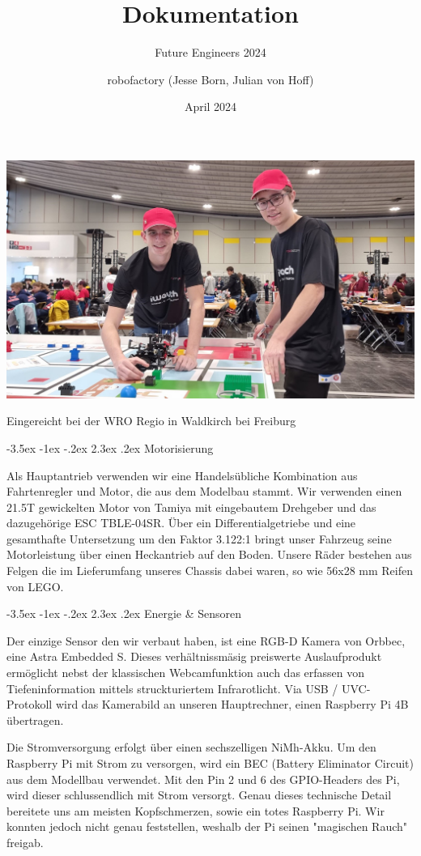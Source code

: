 \documentclass[a4paper]{scrarticle}
\makeatletter
\renewcommand\section{\@startsection {section}{1}{\z@}%
                                   {-3.5ex \@plus -1ex \@minus -.2ex}%
                                   {2.3ex \@plus.2ex}%
                                   {\Huge\AKAfont}}
\renewcommand{\maketitle}{%
																		 \begin{titlepage}
																			 \null\vfill %
																			 \begin{center}
																				{\huge\@title\par}%
																				\vspace{0.5cm} %
																				{\large\@subtitle\par} %
																				\vspace{1.5cm} %
																				{\Large\@author\par}
																				\vspace{2.5cm} %
																				\begin{center}
																					\includegraphics[width=15cm]{team}
																				\end{center}
																				\vfill
																				\vspace{0.5cm} %
																				{\large\@date\par} %
																				Eingereicht bei der WRO Regio in Waldkirch bei Freiburg
																			 \end{center}
																			 \@thanks %
																		 \end{titlepage}%
																	 }
\makeatother
\begin{document}
\title{\AKAfont\Huge\textcolor{AKSAcolor}{Dokumentation}}
\subtitle{Future Engineers 2024}
\author{robofactory (Jesse Born, Julian von Hoff)}
\date{April 2024}


\maketitle
\clearpage
\newpage



\section{Motorisierung}

Als Hauptantrieb verwenden wir eine Handelsübliche Kombination aus Fahrtenregler und Motor, die aus dem Modelbau stammt.
Wir verwenden einen 21.5T gewickelten Motor von Tamiya mit eingebautem Drehgeber und das dazugehörige ESC TBLE-04SR. 
Über ein Differentialgetriebe und eine gesamthafte Untersetzung um den Faktor 3.122:1 bringt unser Fahrzeug seine Motorleistung über einen Heckantrieb auf den Boden.
Unsere Räder bestehen aus Felgen die im Lieferumfang unseres Chassis dabei waren, so wie 56x28 mm Reifen von LEGO.

\section{Energie \& Sensoren}

Der einzige Sensor den wir verbaut haben, ist eine RGB-D Kamera von Orbbec, eine Astra Embedded S.
Dieses verhältnissmäsig preiswerte Auslaufprodukt ermöglicht nebst der klassischen Webcamfunktion auch das erfassen von Tiefeninformation mittels struckturiertem Infrarotlicht.
Via USB / UVC-Protokoll wird das Kamerabild an unseren Hauptrechner, einen Raspberry Pi 4B übertragen.


Die Stromversorgung erfolgt über einen sechszelligen NiMh-Akku. Um den Raspberry Pi mit Strom zu versorgen, wird ein BEC (Battery Eliminator Circuit) aus dem Modellbau verwendet. 
Mit den Pin 2 und 6 des GPIO-Headers des Pi, wird dieser schlussendlich mit Strom versorgt.
Genau dieses technische Detail bereitete uns am meisten Kopfschmerzen, sowie ein totes Raspberry Pi. Wir konnten jedoch nicht genau feststellen, weshalb der Pi seinen "magischen Rauch" freigab.
\end{document}
